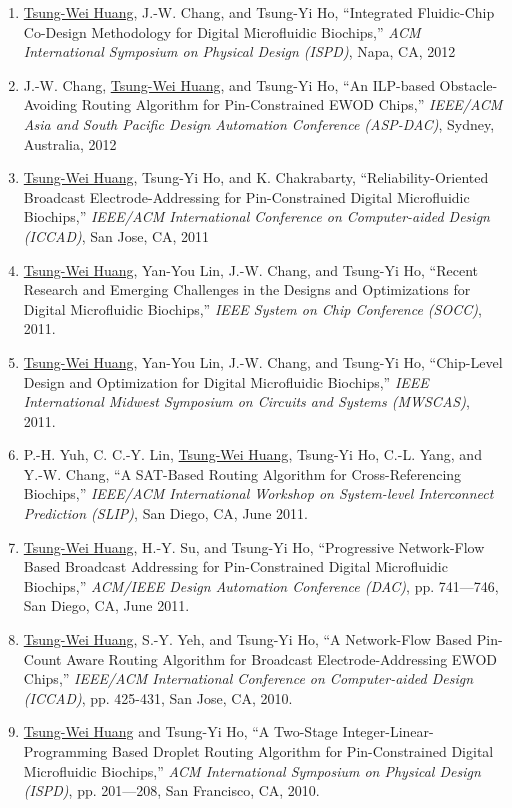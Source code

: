 \documentclass[A4,11pt]{article}
\begin{document}
\begin{enumerate}
    \item \underline{Tsung-Wei Huang}, J.-W. Chang, and Tsung-Yi Ho, ``Integrated Fluidic-Chip Co-Design Methodology for Digital Microfluidic Biochips,'' \textit{ACM International Symposium on Physical Design (ISPD)}, Napa, CA, 2012
    \item J.-W. Chang, \underline{Tsung-Wei Huang}, and Tsung-Yi Ho, ``An ILP-based Obstacle-Avoiding Routing Algorithm for Pin-Constrained EWOD Chips,'' \textit{IEEE/ACM Asia and South Pacific Design Automation Conference (ASP-DAC)}, Sydney, Australia, 2012
    \item \underline{Tsung-Wei Huang}, Tsung-Yi Ho, and K. Chakrabarty, ``Reliability-Oriented Broadcast Electrode-Addressing for Pin-Constrained Digital Microfluidic Biochips,'' \textit{IEEE/ACM International Conference on Computer-aided Design (ICCAD)}, San Jose, CA, 2011
    \item \underline{Tsung-Wei Huang}, Yan-You Lin, J.-W. Chang, and Tsung-Yi Ho, ``Recent Research and Emerging Challenges in the Designs and Optimizations for Digital Microfluidic Biochips,'' \textit{IEEE System on Chip Conference (SOCC)}, 2011. 
    \item \underline{Tsung-Wei Huang}, Yan-You Lin, J.-W. Chang, and Tsung-Yi Ho, ``Chip-Level Design and Optimization for Digital Microfluidic Biochips,'' \textit{IEEE International Midwest Symposium on Circuits and Systems (MWSCAS)}, 2011. 
    \item P.-H. Yuh, C. C.-Y. Lin, \underline{Tsung-Wei Huang}, Tsung-Yi Ho, C.-L. Yang, and Y.-W. Chang, ``A SAT-Based Routing Algorithm for Cross-Referencing Biochips,'' \textit{IEEE/ACM International Workshop on System-level Interconnect Prediction (SLIP)}, San Diego, CA, June 2011.
    \item \underline{Tsung-Wei Huang}, H.-Y. Su, and Tsung-Yi Ho, ``Progressive Network-Flow Based Broadcast Addressing for Pin-Constrained Digital Microfluidic Biochips,'' \textit{ACM/IEEE Design Automation Conference (DAC)}, pp. 741—746, San Diego, CA, June 2011. 
    \item \underline{Tsung-Wei Huang}, S.-Y. Yeh, and Tsung-Yi Ho, ``A Network-Flow Based Pin-Count Aware Routing Algorithm for Broadcast Electrode-Addressing EWOD Chips,'' \textit{IEEE/ACM International Conference on Computer-aided Design (ICCAD)}, pp. 425-431, San Jose, CA, 2010. 
    \item \underline{Tsung-Wei Huang} and Tsung-Yi Ho, ``A Two-Stage Integer-Linear-Programming Based Droplet Routing Algorithm for Pin-Constrained Digital Microfluidic Biochips,'' \textit{ACM International Symposium on Physical Design (ISPD)}, pp. 201—208, San Francisco, CA, 2010. 

\end{enumerate}
\end{document}

